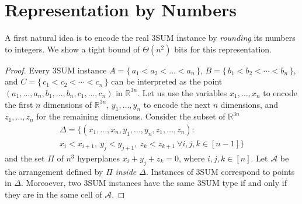\section{Representation by Numbers}%
\label{s:numbers}

A first natural idea is to encode the real 3SUM instance by \emph{rounding} its numbers to integers.
We show a tight bound of $\Theta (n^2)$ bits for this representation.
\restate{\TheoremSUMEncodingBitsize*}

\begin{proof}
Every 3SUM instance \(A = \{\, a_1 < a_2 < \ldots < a_n\,\} \),
\(B = \{\, b_1 < b_2 < \cdots < b_n\,\} \),
and \(C = \{\, c_1 < c_2 < \cdots < c_n\,\}\)
can be interpreted as the point
\( (a_1,\ldots,a_n,b_1,\ldots,b_n,c_1,\ldots,c_n) \)
in \(\mathbb{R}^{3n}\).
Let us use the variables \(x_1,\ldots,x_n\) to encode the first \(n\) dimensions
of \(\mathbb{R}^{3n}\), \(y_1,\ldots,y_n\) to encode the next \(n\) dimensions,
and \(z_1,\ldots,z_n\) for the remaining dimensions.
Consider the subset of $\mathbb{R}^{3n}$
\begin{multline*}
      \Delta = \{ (x_1,\ldots,x_n,y_1,\ldots,y_n,z_1,\ldots,z_n) \colon\, \\
			      x_i<x_{i+1}, ~y_j<y_{j+1}, ~ z_k<z_{k+1}~ \forall i,j,k \in [n-1]\}
\end{multline*}
and the set $\Pi$ of $n^3$ hyperplanes $x_i+y_j+z_k=0$, where $i,j,k\in [n]$.
Let $\mathcal{A}$ be the arrangement defined
by $\Pi$ \emph{inside $\Delta$}. Instances of 3SUM correspond to points in $\Delta$.
Moreoever, two 3SUM instances have the same 3SUM type if and only if they are
in the same cell of $\mathcal{A}$.


\end{proof}
